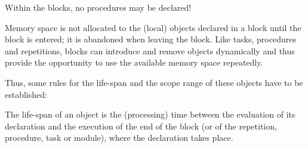 Within the blocks, no procedures may be declared!

Memory space is not allocated to the (local) objects declared in a block
until the block is entered; it is abandoned when leaving the block. Like
tasks, procedures and repetitions, blocks can introduce and remove
objects dynamically and thus provide the opportunity to use the
available memory space repeatedly.

Thus, some rules for the life-span and the scope range of these objects
have to be established:

The life-span of an object is the (processing) time between the
evaluation of its declaration and the execution of the end of the block
(or of the repetition, procedure, task or module), where the declaration
takes place.


